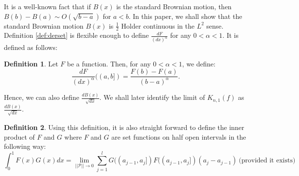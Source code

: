 \documentclass[reqno,12pt]{amsart}
\theoremstyle{plain}
\theoremstyle{definition}
\newtheorem{definition}{Definition}
\begin{document}
It is a well-known fact that if $B(x)$ is the standard Brownian motion, then $B(b)-B(a) \sim O(\sqrt{b-a})$ for $a<b$. In this paper, we shall show that the standard Brownian motion $B(x)$ is $\frac{1}{2}$ Holder continuous in the $L^{2}$ sense. Definition  \ref{def:derset} is flexible enough to define $\frac{dF}{(dx)^{\alpha}}$ for any $0< \alpha <1$. It is defined as follows:
\begin{definition}\label{def:dersetalpha}
Let $F$ be a function. Then, for any $0<\alpha <1$, we define:
\[
\frac{dF}{(dx)^{\alpha}}((a,b])= \frac{F(b)-F(a)}{(b-a)^{\alpha}}.
\]
\end{definition}
Hence, we can also define $\frac{dB(x)}{\sqrt{dx}}$. We shall later identify the limit of $K_{n,1}(f)$ as $\frac{dB(x)}{\sqrt{dx}}$. 
\begin{definition}
Using this definition, it is also straight forward to define the inner product of $F$ and $G$ where $F$ and $G$ are set functions on half open intervals in the following way:
\begin{equation}\label{def:inner}
\int_{0}^{1} F(x)G(x) dx= \lim_{||\mathcal{P}|| \to 0} \sum_{j=1}^{l} G((a_{j-1},a_{j}])F((a_{j-1},a_{j}]) (a_{j}-a_{j-1}) ~ \text{(provided it exists)}
\end{equation}
\end{definition}
\end{document}
